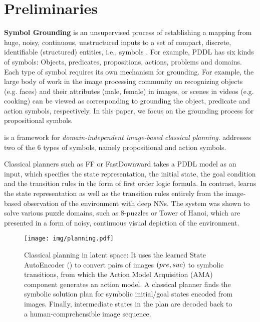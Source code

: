 \section{Preliminaries}
\label{background}

\textbf{Symbol Grounding} is an unsupervised process of establishing a mapping
from huge, noisy, continuous, unstructured inputs
to a set of compact, %
discrete, identifiable (structured) entities, i.e., symbols \cite{Asai2018}.
For example, PDDL has six kinds of symbols: Objects, predicates, propositions, actions, problems and domains.
Each type of symbol requires its own mechanism for grounding.
For example, the large body of work in the image processing community on recognizing 
objects (e.g. faces) and their attributes (male, female) in images, or scenes in videos (e.g. cooking)
can be viewed as corresponding to grounding the object, predicate and action symbols, respectively.
In this paper, we focus on the grounding process for propositional symbols.

\textbf{\latentplanner} \cite{Asai2018} is a framework for
\emph{domain-independent image-based classical planning}.
\latentplanner addresses two of the 6 types of symbols, %
namely propositional and action symbols.

Classical planners such as FF \cite{Hoffmann01} or
FastDownward \cite{Helmert04} takes a PDDL model as an input, which
specifies the state representation, the initial state, the goal
condition and the transition rules in the form of first order logic
formula.  In contrast, \latentplanner learns the state representation as well as the transition rules
entirely from the image-based observation of the environment with deep NNs.
The system was shown to solve various puzzle domains, such as 8-puzzles or Tower of Hanoi,
which are presented in a form of noisy, continuous visual depiction of the environment.

\begin{figure}[htb]
 \centering
 \texttt{[image: img/planning.pdf]}
 \caption{Classical planning in latent space:
It uses the learned State AutoEncoder () to convert pairs of images $(pre,suc)$ to symbolic transitions,
 from which the Action Model Acquisition (AMA) component generates an action model.
A classical planner finds the symbolic solution plan for symbolic initial/goal states encoded from images.
Finally, intermediate states in the plan are decoded back to a human-comprehensible image sequence.}
\label{fig:overview}
\end{figure}

